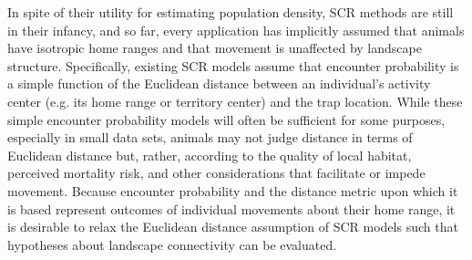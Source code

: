 \documentclass[12pt]{article}
\begin{document}
\begin{spacing}{1.8}
In spite of their utility for estimating population density, SCR
methods are still in their infancy, and so far, every application
has implicitly assumed that animals have isotropic home
ranges and that movement is unaffected by landscape
structure. Specifically, existing SCR models assume that %
encounter
probability is a simple function of the Euclidean distance between an
individual's activity center (e.g. its home range or territory center)
and the trap location.
While these simple encounter probability models will often
be sufficient for some purposes, especially in small data sets,
animals may not judge distance in terms of Euclidean distance but,
rather, according to the quality of local habitat, %
perceived mortality risk, and other considerations that facilitate or
impede movement. Because %
encounter probability and the distance
metric upon which it is based represent outcomes of individual
movements about their home range, it is desirable to relax the
Euclidean distance assumption of SCR models such that
hypotheses about landscape connectivity
can be evaluated.

\end{spacing}
\end{document}
